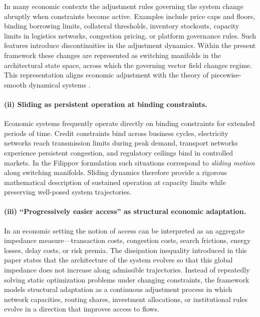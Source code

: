 \documentclass[12pt]{article}
\theoremstyle{plain}
\theoremstyle{definition}
\theoremstyle{remark}
\begin{document}
In many economic contexts the adjustment rules governing the system
change abruptly when constraints become active.
Examples include price caps and floors, binding borrowing limits,
collateral thresholds, inventory stockouts, capacity limits in
logistics networks, congestion pricing, or platform governance rules.
Such features introduce discontinuities in the adjustment dynamics.
Within the present framework these changes are represented as switching
manifolds in the architectural state space, across which the governing
vector field changes regime.
This representation aligns economic adjustment with the theory of
piecewise-smooth dynamical systems \cite{Filippov1988,diBernardo2008}.

\paragraph{(ii) Sliding as persistent operation at binding constraints.}

Economic systems frequently operate directly on binding constraints for
extended periods of time.
Credit constraints bind across business cycles,
electricity networks reach transmission limits during peak demand,
transport networks experience persistent congestion,
and regulatory ceilings bind in controlled markets.
In the Filippov formulation such situations correspond to
\emph{sliding motion} along switching manifolds.
Sliding dynamics therefore provide a rigorous mathematical description
of sustained operation at capacity limits while preserving well-posed
system trajectories.

\paragraph{(iii) ``Progressively easier access'' as structural economic adaptation.}

In an economic setting the notion of access can be interpreted as an
aggregate impedance measure—transaction costs, congestion costs,
search frictions, energy losses, delay costs, or risk premia.
The dissipation inequality introduced in this paper states that the
architecture of the system evolves so that this global impedance
does not increase along admissible trajectories.
Instead of repeatedly solving static optimization problems under
changing constraints, the framework models structural adaptation as a
continuous adjustment process in which network capacities, routing
shares, investment allocations, or institutional rules evolve in a
direction that improves access to flows.
\end{document}
